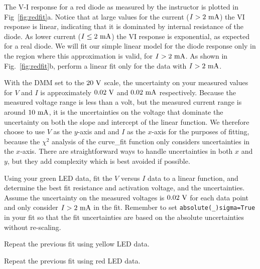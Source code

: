 The V-I response for a red diode as measured by the instructor is
plotted in Fig~\ref{fig:redfit}a.  Notice that at large values for the
current ($I > 2~\rm mA$) the VI response is linear, indicating that it
is dominated by internal resistance of the diode.  As lower current
($I \leq 2~\rm mA$) the VI response is exponential, as expected for a
real diode.  We will fit our simple linear model for the diode
response only in the region where this approximation is valid, for
$I>2~\rm mA$.  As shown in Fig.~\ref{fig:redfit}b, perform a linear
fit only for the data with $I>2~\rm mA$.

With the DMM set to the $20~\rm V$ scale, the uncertainty on your
measured values for $V$ and $I$ is approximately $0.02~\rm V$ and
$0.02~\rm mA$ respectively.  Because the measured voltage range is
less than a volt, but the measured current range is around $10~\rm
mA$, it is the uncertainties on the voltage that dominate the
uncertainty on both the slope and intercept of the linear function.
We therefore choose to use $V$ as the $y$-axis and and $I$ as the
$x$-axis for the purposes of fitting, because the $\chi^2$ analysis of
the {\rm curve{\_}fit} function only considers uncertainties in the
$x$-axis.  There are straightforward ways to handle uncertainties in
both $x$ and $y$, but they add complexity which is best avoided if
possible.

\begin{plot}
Using your green LED data, fit the $V$ versus $I$ data to a linear function, and
determine the best fit resistance and activation voltage, and the
uncertainties.  Assume the uncertainty on the measured voltages is
$0.02~\rm V$ for each data point and only consider $I > 2~\rm mA$ in
the fit.  Remember to set {\tt absolute(\_)sigma=True} in your fit so
that the fit uncertainties are based on the absolute uncertainties
without re-scaling.
\end{plot}

\begin{plot}
Repeat the previous fit using yellow LED data.
\end{plot}

\begin{plot}
Repeat the previous fit using red LED data.
\end{plot}  

